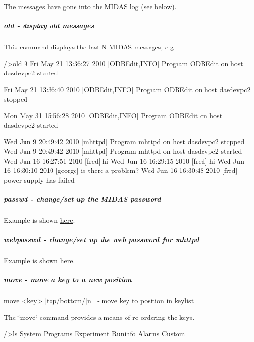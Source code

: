 The messages have gone into the MIDAS log (see \hyperlink{RC_odbedit_examples_RC_odbedit_old}{below}).



\hypertarget{RC_odbedit_examples_RC_odbedit_old}{}\subparagraph{old -\/ display old messages}\label{RC_odbedit_examples_RC_odbedit_old}
This command displays the last N MIDAS messages, e.g. 
\begin{DoxyCode}
/>old 9
Fri May 21 13:36:27 2010 [ODBEdit,INFO] Program ODBEdit on host dasdevpc2 started
      
Fri May 21 13:36:40 2010 [ODBEdit,INFO] Program ODBEdit on host dasdevpc2 stopped
      
Mon May 31 15:56:28 2010 [ODBEdit,INFO] Program ODBEdit on host dasdevpc2 started
      
Wed Jun  9 20:49:42 2010 [mhttpd] Program mhttpd on host dasdevpc2 stopped
Wed Jun  9 20:49:42 2010 [mhttpd] Program mhttpd on host dasdevpc2 started
Wed Jun 16 16:27:51 2010 [fred] hi
Wed Jun 16 16:29:15 2010 [fred] hi
Wed Jun 16 16:30:10 2010 [george] is there a problem?
Wed Jun 16 16:30:48 2010 [fred] power supply has failed
\end{DoxyCode}




\hypertarget{RC_odbedit_examples_RC_odbedit_passwd}{}\subparagraph{passwd -\/ change/set up the MIDAS password}\label{RC_odbedit_examples_RC_odbedit_passwd}
Example is shown \hyperlink{RC_customize_ODB_RC_Setup_Security}{here}.



\hypertarget{RC_odbedit_examples_RC_odbedit_webpasswd}{}\subparagraph{webpasswd -\/ change/set up the web password for mhttpd}\label{RC_odbedit_examples_RC_odbedit_webpasswd}
Example is shown \hyperlink{RC_customize_ODB_RC_Setup_Web_Security}{here}.



\hypertarget{RC_odbedit_examples_RC_odbedit_move}{}\subparagraph{move -\/ move a key to a new position}\label{RC_odbedit_examples_RC_odbedit_move}

\begin{DoxyCode}
move <key> [top/bottom/[n]] - move key to position in keylist
\end{DoxyCode}


The \char`\"{}move\char`\"{} command provides a means of re-\/ordering the keys. 
\begin{DoxyCode}
/>ls
System
Programs
Experiment
Runinfo
Alarms
Custom
\end{DoxyCode}


